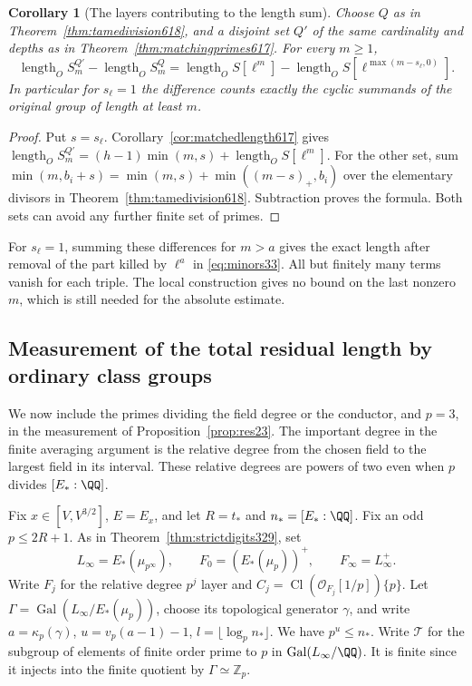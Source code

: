 \documentclass[a4paper,11pt]{article}
\newtheorem{corollary}[proposition]{Corollary}
\theoremstyle{definition}
\theoremstyle{remark}
\newcommand{\ZZ}{\mathbb Z}\newcommand{\ord}{\operatorname{ord}}
\numberwithin{equation}{section}
\newcommand{\Cl}{\operatorname{Cl}}
\begin{document}
\begin{corollary}[The layers contributing to the length sum]
\label{cor:tamelayers618}
Choose \(Q\) as in Theorem~\ref{thm:tamedivision618}, and a disjoint
set \(Q'\) of the same cardinality and depths as in
Theorem~\ref{thm:matchingprimes617}. For every \(m\ge1\),
\[
 \operatorname{length}_O S_m^{Q'}-\operatorname{length}_O S_m^{Q}
    =\operatorname{length}_O S[\ell^m]
       -\operatorname{length}_O S[\ell^{\max(m-s_\ell,0)}].
\]
In particular for \(s_\ell=1\) the difference counts exactly the
cyclic summands of the original group of length at least \(m\).
\end{corollary}
\begin{proof}
Put \(s=s_\ell\). Corollary~\ref{cor:matchedlength617} gives
\(\operatorname{length}_O S_m^{Q'}=(h-1)\min(m,s)
+\operatorname{length}_O S[\ell^m]\). For the other set, sum
\(\min(m,b_i+s)=\min(m,s)+\min((m-s)_+,b_i)\) over the elementary
divisors in Theorem~\ref{thm:tamedivision618}. Subtraction proves
the formula. Both sets can avoid any further finite set of primes.
\end{proof}

For \(s_\ell=1\), summing these differences for \(m>a\) gives
the exact length after removal of the part killed by \(\ell^a\)
in \eqref{eq:minors33}. All but finitely many terms vanish for
each triple. The local construction gives no bound on the last
nonzero \(m\), which is still needed for the absolute estimate.


\subsection{Measurement of the total residual length by ordinary class groups}
\label{sec:totalresidual649}

We now include the primes dividing the field degree or the
conductor, and \(p=3\), in the measurement of
Proposition~\ref{prop:res23}. The important degree in the
finite averaging argument is the relative degree from the
chosen field to the largest field in its interval. These
relative degrees are powers of two even when \(p\) divides
\([E_*:\QQ]\).

Fix \(x\in[V,V^{3/2}]\), \(E=E_x\), and let \(R=t_*\) and
\(n_*=[E_*:\QQ]\). Fix an odd \(p\le 2R+1\). As in
Theorem~\ref{thm:strictdigits329}, set
\[
 L_\infty=E_*(\mu_{p^\infty}),\qquad F_0=(E_*(\mu_p))^+,
 \qquad F_\infty=L_\infty^+ .
\]
Write \(F_j\) for the relative degree \(p^j\) layer and
\(C_j=\Cl(\mathcal O_{F_j}[1/p])\{p\}\).
Let \(\Gamma=\operatorname{Gal}(L_\infty/E_*(\mu_p))\),
choose its topological generator \(\gamma\), and write
\(a=\kappa_p(\gamma)\), \(u=v_p(a-1)-1\),
\(l=\lfloor\log_p n_*\rfloor\). We have \(p^u\le n_*\).
Write \(\mathcal T\) for the subgroup of elements of finite
order prime to \(p\) in \(\operatorname{Gal}(L_\infty/\QQ)\).
It is finite since it injects into the finite quotient by
\(\Gamma\simeq\ZZ_p\).
\end{document}
